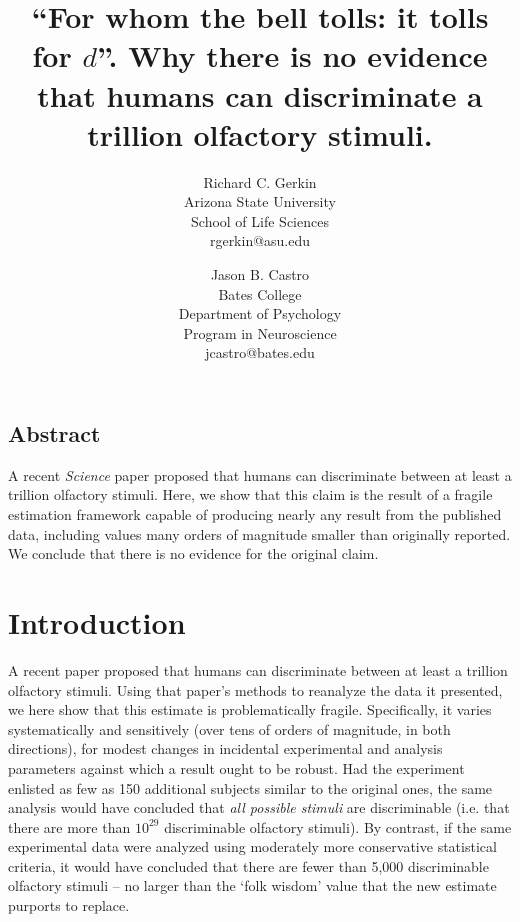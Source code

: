 \documentclass[letterpaper,twocolumn,10pt]{article}
\begin{document}
\setcounter{table}{0}
\setcounter{section}{0}

\date{}

\title{\Large \bf ``For whom the bell tolls: it tolls for $d$''.  Why there is no evidence that humans can discriminate a trillion olfactory stimuli.}

\author{
{\rm Richard C. Gerkin}\\
Arizona State University\\
School of Life Sciences\\
rgerkin@asu.edu
\and
{\rm Jason B. Castro}\\
Bates College\\
Department of Psychology\\
Program in Neuroscience \\
jcastro@bates.edu
}

\maketitle

\thispagestyle{empty}


\subsection*{Abstract}
A recent \textit{Science} paper \cite{bushdid_humans_2014} proposed that humans can discriminate between at least a trillion olfactory stimuli. 
Here, we show that this claim is the result of a fragile estimation framework capable of producing nearly any result from the published data, 
including values many orders of magnitude smaller than originally reported. 
We conclude that there is no evidence for the original claim.  

\section{Introduction}
\label{sec:intro}
A recent paper \cite{bushdid_humans_2014} proposed that humans can discriminate between at least a trillion olfactory stimuli. 
Using that paper's methods to reanalyze the data it presented, 
we here show that this estimate is problematically fragile. 
Specifically, it varies systematically and sensitively 
(over tens of orders of magnitude, in both directions), 
for modest changes in incidental experimental and analysis parameters against which a result ought to be robust.  
Had the experiment enlisted as few as 150 additional subjects similar to the original ones, 
the same analysis would have concluded that \textit{all possible stimuli} are discriminable 
(i.e. that there are more than $10^{29}$ discriminable olfactory stimuli). 
By contrast, if the same experimental data were analyzed using moderately more conservative statistical criteria, 
it would have concluded that there are fewer than 5,000 discriminable olfactory stimuli -- 
no larger than the `folk wisdom' value that the new estimate purports to replace. 
\end{document}
